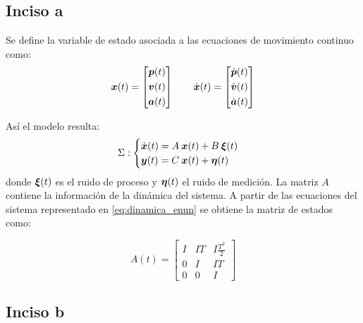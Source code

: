 \subsection{Inciso a}

	Se define la variable de estado asociada a las ecuaciones de movimiento continuo como:
		\begin{equation*}
			\vect{x}(t) = \begin{bmatrix} \vect{p}(t) \\[0.3em] \vect{v}(t) \\[0.3em] \vect{a}(t) \end{bmatrix} \qquad%
			\dot{\vect{x}}(t) = \begin{bmatrix} \dot{\vect{p}}(t) \\[0.3em] \dot{\vect{v}}(t) \\[0.3em] \dot{\vect{a}}(t) \end{bmatrix}
		\end{equation*}

	Así el modelo resulta:
		\begin{equation*}
			\Sigma:
			\begin{cases}
				\dot{\boldsymbol{x}}(t) = A\: \boldsymbol{x}(t) + B \: \boldsymbol{\xi}(t) \\
				\boldsymbol{y}(t) = C\: \boldsymbol{x}(t) + \boldsymbol{\eta}(t)
			\end{cases}
		\end{equation*}
	donde $\boldsymbol{\xi}(t)$ es el ruido de proceso y $\boldsymbol{\eta}(t)$ el ruido de medición. La matriz $A$ contiene la información de la dinámica del sistema. A partir de las ecuaciones del sistema representado en \eqref{eq:dinamica_enun} se obtiene la matriz de estados como:

		\begin{equation*}
			A(t) = \begin{bmatrix} I & IT & I\frac{T^2}{2} \\[0.3em] 0 & I & IT \\[0.3em] 0 & 0 & I \end{bmatrix}
		\end{equation*}


\subsection{Inciso b}

